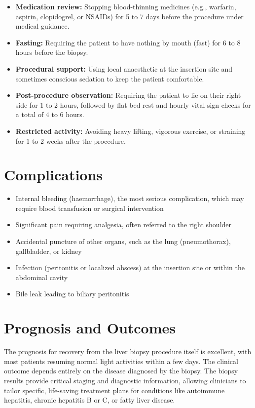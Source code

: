 \begin{itemize}
    \item \textbf{Medication review:} Stopping blood-thinning medicines (e.g., warfarin, aspirin, clopidogrel, or NSAIDs) for 5 to 7 days before the procedure under medical guidance.
    \item \textbf{Fasting:} Requiring the patient to have nothing by mouth (fast) for 6 to 8 hours before the biopsy.
    \item \textbf{Procedural support:} Using local anaesthetic at the insertion site and sometimes conscious sedation to keep the patient comfortable.
    \item \textbf{Post-procedure observation:} Requiring the patient to lie on their right side for 1 to 2 hours, followed by flat bed rest and hourly vital sign checks for a total of 4 to 6 hours.
    \item \textbf{Restricted activity:} Avoiding heavy lifting, vigorous exercise, or straining for 1 to 2 weeks after the procedure.
\end{itemize}

\section*{Complications}
\begin{itemize}
    \item Internal bleeding (haemorrhage), the most serious complication, which may require blood transfusion or surgical intervention
    \item Significant pain requiring analgesia, often referred to the right shoulder
    \item Accidental puncture of other organs, such as the lung (pneumothorax), gallbladder, or kidney
    \item Infection (peritonitis or localized abscess) at the insertion site or within the abdominal cavity
    \item Bile leak leading to biliary peritonitis
\end{itemize}

\section*{Prognosis and Outcomes}
The prognosis for recovery from the liver biopsy procedure itself is excellent, with most patients resuming normal light activities within a few days. The clinical outcome depends entirely on the disease diagnosed by the biopsy. The biopsy results provide critical staging and diagnostic information, allowing clinicians to tailor specific, life-saving treatment plans for conditions like autoimmune hepatitis, chronic hepatitis B or C, or fatty liver disease.

